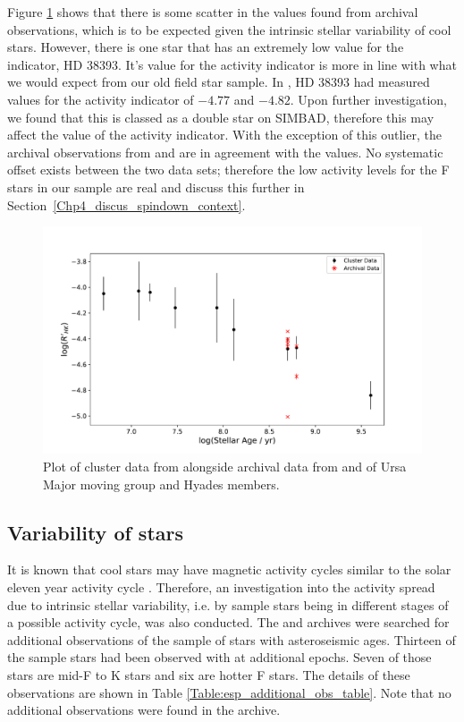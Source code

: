 Figure \ref{fig:cluster_data_comparison} shows that there is some scatter in the \Rprime values found from archival observations, which is to be expected given the intrinsic stellar variability of cool stars. However, there is one star that has an extremely low value for the \Rprime indicator, HD 38393. It's value for the \Rprime activity indicator is more in line with what we would expect from our old field star sample. In \citet{Mamajek_Hillenbrand_2008}, HD 38393 had measured values for the \Rprime activity indicator of $-4.77$ and $-4.82$. Upon further investigation, we found that this is classed as a double star on SIMBAD, therefore this may affect the value of the \Rprime activity indicator. With the exception of this outlier, the archival observations from \esp and \narval are in agreement with the \citet{Mamajek_Hillenbrand_2008} values. No systematic offset exists between the two data sets; therefore the low activity levels for the F stars in our sample are real and discuss this further in Section~\ref{Chp4_discus_spindown_context}.

\begin{figure}
    \centering
    \includegraphics[scale=0.5]{Figures/4-Chromospheric_age/cluster_data.pdf}
    \caption[Analysis of cluster members]{Plot of cluster data from \citet{Mamajek_Hillenbrand_2008} alongside archival data from \esp and \narval of Ursa Major moving group and Hyades members.}
    \label{fig:cluster_data_comparison}
\end{figure}

\subsection{Variability of stars}
\label{Chp4_results_variability}
It is known that cool stars may have magnetic activity cycles similar to the solar eleven year activity cycle \citep{Wilson_1978,Baliunas_etal_1995}. Therefore, an investigation into the activity spread due to intrinsic stellar variability, i.e. by sample stars being in different stages of a possible activity cycle, was also conducted. The \esp and \narval archives were searched for additional observations of the sample of stars with asteroseismic ages. Thirteen of the sample stars had been observed with \esp at additional epochs. Seven of those stars are mid-F to K stars and six are hotter F stars. The details of these observations are shown in Table \ref{Table:esp_additional_obs_table}. Note that no additional observations were found in the \narval archive.

